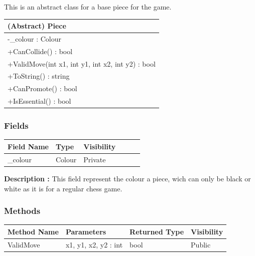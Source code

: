 \documentclass[12pt]{article}
\begin{document}
This is an abstract class for a base piece for the game.
\begin{table}[H]
    \begin{tabular}{|l|}
    \hline
    \cellcolor[HTML]{C0C0C0}\textbf{(Abstract) Piece}  \\ \hline
    \cellcolor[HTML]{EFEFEF}-\_colour : Colour         \\ \hline
    +CanCollide() : bool                               \\ \hline
    +ValidMove(int x1, int y1, int x2, int y2) : bool  \\ \hline
    +ToString() : string                               \\ \hline
    +CanPromote() : bool                               \\ \hline
    +IsEssential() : bool                              \\ \hline
    \end{tabular}
\end{table}

\subsubsection{Fields}

\begin{table}[H]
    \begin{tabular}{llllll}
    \hline
    \multicolumn{1}{|l|}{\cellcolor[HTML]{EFEFEF}\textbf{Field Name}} & \multicolumn{1}{l|}{\cellcolor[HTML]{EFEFEF}\textbf{Type}} & \multicolumn{1}{l|}{\cellcolor[HTML]{EFEFEF}\textbf{Visibility}} \\ \hline
    \multicolumn{1}{|l|}{\_colour}                                    & \multicolumn{1}{l|}{Colour}                                & \multicolumn{1}{l|}{Private}                                     \\ \hline
    \end{tabular}
\end{table}

\textbf{Description :} This field represent the colour a piece, wich can only be
black or white as it is for a regular chess game.


\subsubsection{Methods}

\begin{table}[H]
    \begin{tabular}{|l|l|l|l|}
    \hline
    \rowcolor[HTML]{EFEFEF} 
    \cellcolor[HTML]{EFEFEF}\textbf{Method Name} & \textbf{Parameters}  & \textbf{Returned Type} & \textbf{Visibility} \\ \hline
    ValidMove                          & x1, y1, x2, y2 : int & bool                   & Public              \\ \hline
    \end{tabular}
\end{table}
\end{document}
